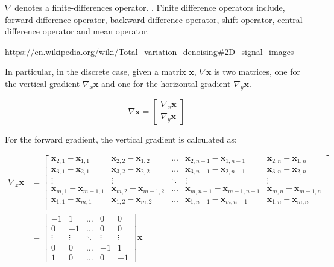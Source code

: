 \documentclass[12pt]{article}
\begin{document}
$\nabla$ denotes a finite-differences operator.
\cite{finite_difference_op}.
Finite difference operators include, forward difference operator,
backward difference operator, shift operator, central difference operator and mean operator.

\url{https://en.wikipedia.org/wiki/Total_variation_denoising#2D_signal_images}


In particular, in the discrete case, given a matrix $\mathbf{x}$, $\nabla \mathbf{x}$ is two matrices, one for the vertical gradient $\nabla_{x} \mathbf{x}$ and one for the horizontal gradient $\nabla_{y} \mathbf{x}$.

\begin{equation}
  \nabla \mathbf{x} = \begin{bmatrix}
    \nabla_{x} \mathbf{x} \\
    \nabla_{y} \mathbf{x}
  \end{bmatrix}
\end{equation}



For the forward gradient, the vertical gradient is calculated as:

\begin{equation}
  \begin{align}
  \nabla_{x} \mathbf{x} &= \begin{bmatrix}
    \mathbf{x}_{2,1} - \mathbf{x}_{1,1} & \mathbf{x}_{2, 2} - \mathbf{x}_{1, 2} & \ldots & \mathbf{x}_{2, n-1} - \mathbf{x}_{1, n-1} & \mathbf{x}_{2, n} - \mathbf{x}_{1, n} \\
    \mathbf{x}_{3,1} - \mathbf{x}_{2,1} & \mathbf{x}_{3, 2} - \mathbf{x}_{2, 2} & \ldots & \mathbf{x}_{3, n-1} - \mathbf{x}_{2, n-1} & \mathbf{x}_{3, n} - \mathbf{x}_{2, n}  \\
    \vdots & \vdots & \ddots & \vdots & \vdots \\
    \mathbf{x}_{m,1} - \mathbf{x}_{m-1,1} & \mathbf{x}_{m, 2} - \mathbf{x}_{m-1, 2} & \ldots & \mathbf{x}_{m, n-1} - \mathbf{x}_{m-1, n-1} & \mathbf{x}_{m, n} - \mathbf{x}_{m-1, n} \\
    \mathbf{x}_{1, 1} - \mathbf{x}_{m, 1} & \mathbf{x}_{1, 2} - \mathbf{x}_{m, 2} & \ldots & \mathbf{x}_{1, n-1} - \mathbf{x}_{m, n-1} & \mathbf{x}_{1, n} - \mathbf{x}_{m, n} \\
  \end{bmatrix} \\
  &= \begin{bmatrix}
    -1 & 1 & \ldots & 0 & 0 \\
    0 & -1 & \ldots & 0 & 0 \\
     \vdots & \vdots & \ddots & \vdots & \vdots \\
    0 & 0 & \ldots & -1 & 1 \\
    1 & 0 & \ldots & 0 & -1
    \end{bmatrix} \mathbf{x}
  \end{align}
\end{equation}
\end{document}
